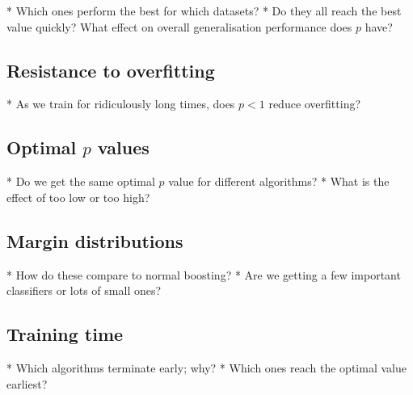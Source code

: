 * Which ones perform the best for which datasets?
* Do they all reach the best value quickly?  What effect on overall generalisation performance does $p$ have?

\subsection{Resistance to overfitting}

* As we train for ridiculously long times, does $p < 1$ reduce overfitting?

\subsection{Optimal $p$ values}

* Do we get the same optimal $p$ value for different algorithms?
* What is the effect of too low or too high?

\subsection{Margin distributions}

* How do these compare to normal boosting?
* Are we getting a few important classifiers or lots of small ones?

\subsection{Training time}

* Which algorithms terminate early; why?
* Which ones reach the optimal value earliest?





